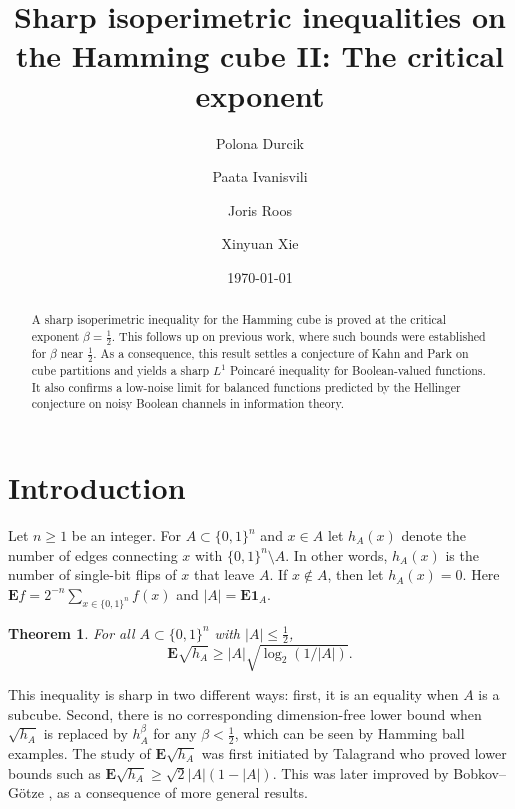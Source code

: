 \documentclass[11pt]{amsart}
\title[Sharp isoperimetric inequalities]{Sharp isoperimetric inequalities on the Hamming cube II: The critical exponent}
\author[P. Durcik]{Polona Durcik}
\author[P. Ivanisvili]{Paata Ivanisvili}
\author[J. Roos]{Joris Roos}
\author[X. Xie]{Xinyuan Xie}
\date{\today}
\theoremstyle{plain}
\newtheorem{thm}{Theorem}[section]
\theoremstyle{definition}
\theoremstyle{remark}
\numberwithin{equation}{section}
\begin{document}
\begin{abstract}
A sharp isoperimetric inequality for the Hamming cube is proved at the critical exponent $\beta=\frac12$. This follows up on previous work, where such bounds were established for $\beta$ near $\frac12$.
As a consequence, this result settles a conjecture of Kahn and Park on cube partitions and yields a sharp $L^1$ Poincar\'e inequality for Boolean-valued functions. It also confirms a low-noise limit for balanced functions predicted by the Hellinger conjecture on noisy Boolean channels in information theory.
\end{abstract}


\maketitle

\section{Introduction}
Let $n\ge 1$ be an integer.
For $A\subset \{0,1\}^n$ and $x\in A$ let
$h_A(x)$ denote the number of edges connecting $x$ with $\{0,1\}^n\setminus A$. In other words, $h_A(x)$ is the number of single-bit flips of $x$ that leave $A$.
If $x\not\in A$, then let $h_A(x)=0$.
Here $\mathbf{E}f=2^{-n} \sum_{x\in \{0,1\}^n} f(x)$ and $|A|=\mathbf{E} \mathbf{1}_A$.

\begin{thm}\label{thm:mainisoperim}
For all $A\subset \{0,1\}^n$ with $|A|\le \frac12$,
\begin{equation}\label{eqn:isoperimhalf}
\mathbf{E} \sqrt{h_A} \ge |A| \sqrt{\log_2(1/|A|)}.
\end{equation}
\end{thm}

This inequality is sharp in two different ways: first, it is an equality when $A$ is a subcube.
Second, there is no corresponding dimension-free lower bound when $\sqrt{h_A}$ is replaced by $h_A^\beta$ for any $\beta<\frac12$, which can be seen by Hamming ball examples.
The study of $\mathbf{E} \sqrt{h_A}$ was first initiated by Talagrand \cite{Tal93} who proved lower bounds such as $\mathbf{E}\sqrt{h_A}\ge \sqrt{2}|A|(1-|A|)$. This was later improved by Bobkov--G\"otze \cite{BG99}, as a consequence of more general results.
\end{document}
